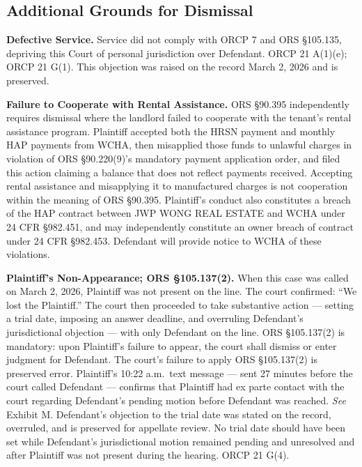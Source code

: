 \documentclass[12pt,letterpaper]{article}
\begin{document}
\subsection{Additional Grounds for Dismissal}

\textbf{Defective Service.} Service did not comply with ORCP 7 and ORS \S105.135, depriving this Court of personal jurisdiction over Defendant. ORCP 21 A(1)(e); ORCP 21 G(1). This objection was raised on the record March 2, 2026 and is preserved.

\textbf{Failure to Cooperate with Rental Assistance.} ORS \S90.395 independently requires dismissal where the landlord failed to cooperate with the tenant's rental assistance program. Plaintiff accepted both the HRSN payment and monthly HAP payments from WCHA, then misapplied those funds to unlawful charges in violation of ORS \S90.220(9)'s mandatory payment application order, and filed this action claiming a balance that does not reflect payments received. Accepting rental assistance and misapplying it to manufactured charges is not cooperation within the meaning of ORS \S90.395. Plaintiff's conduct also constitutes a breach of the HAP contract between JWP WONG REAL ESTATE and WCHA under 24 CFR \S982.451, and may independently constitute an owner breach of contract under 24 CFR \S982.453. Defendant will provide notice to WCHA of these violations.

\textbf{Plaintiff's Non-Appearance; ORS \S105.137(2).} When this case was called on March 2, 2026, Plaintiff was not present on the line. The court confirmed: ``We lost the Plaintiff.'' The court then proceeded to take substantive action --- setting a trial date, imposing an answer deadline, and overruling Defendant's jurisdictional objection --- with only Defendant on the line. ORS \S105.137(2) is mandatory: upon Plaintiff's failure to appear, the court shall dismiss or enter judgment for Defendant. The court's failure to apply ORS \S105.137(2) is preserved error. Plaintiff's 10:22 a.m.\ text message --- sent 27 minutes before the court called Defendant --- confirms that Plaintiff had ex parte contact with the court regarding Defendant's pending motion before Defendant was reached. \textit{See} Exhibit M. Defendant's objection to the trial date was stated on the record, overruled, and is preserved for appellate review. No trial date should have been set while Defendant's jurisdictional motion remained pending and unresolved and after Plaintiff was not present during the hearing. ORCP 21 G(4).

\end{document}
